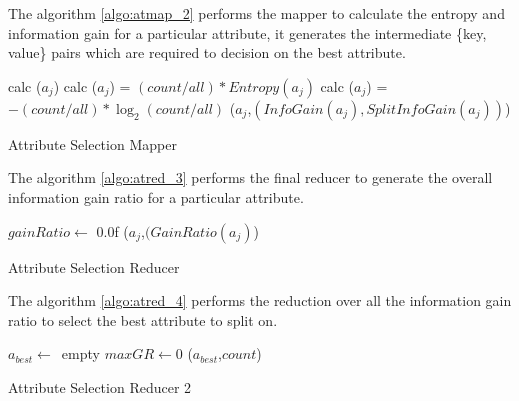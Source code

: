 \documentclass{article}
\begin{document}
The algorithm \ref{algo:atmap_2} performs the mapper to calculate the entropy and information gain for a particular attribute, it generates the intermediate \{key, value\} pairs which are required to decision on the best attribute.

\IncMargin{1em}
\begin{algorithm}[H]
\DontPrintSemicolon
{}
\BlankLine
calc \Entropy(${a_{j}}$)\;
calc \InfoGain(${a_{j}}$) = ${(count/all) * Entropy(a_{j})}$\;
calc \SplitInfoGain(${a_{j}}$) = ${- (count/all) * \log_{2}{(count/all)}}$\;
\emit(${a_{j}}$,$(InfoGain(a_{j}), SplitInfoGain(a_{j}))$)
\caption{Attribute Selection Mapper\label{algo:atmap_2}}
\end{algorithm}
\DecMargin{1em}

The algorithm \ref{algo:atred_3} performs the final reducer to generate the overall information gain ratio for a particular attribute.

\IncMargin{1em}
\begin{algorithm}[H]
\DontPrintSemicolon
{}
\BlankLine
$gainRatio\leftarrow$ 0.0f\;
\emit(${a_{j}}$,$(GainRatio(a_{j})$)
\caption{Attribute Selection Reducer\label{algo:atred_3}}
\end{algorithm}
\DecMargin{1em}


The algorithm \ref{algo:atred_4} performs the reduction over all the information gain ratio to select the best attribute to split on.

\IncMargin{1em}
\begin{algorithm}[H]
\DontPrintSemicolon
{}
\BlankLine
$a_{best}\leftarrow$\ empty\;
$maxGR\leftarrow 0$\;
\emit(${a_{best}}$,$count$)
\caption{Attribute Selection Reducer 2\label{algo:atred_4}}
\end{algorithm}
\DecMargin{1em}
\end{document}
